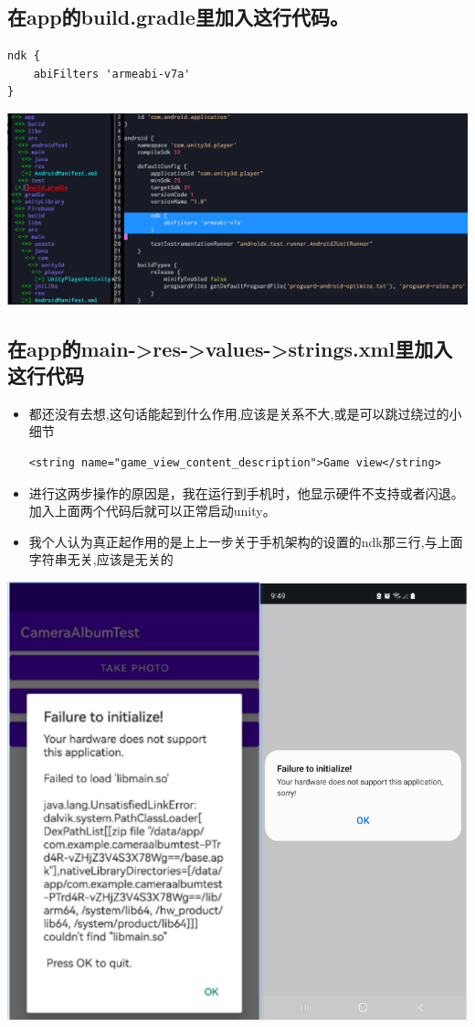 \documentclass[9pt, b5paper]{article}
\begin{document}
\subsection{在app的build.gradle里加入这行代码。}
\label{sec-4-3}
\begin{verbatim}
ndk {
    abiFilters 'armeabi-v7a'
}
\end{verbatim}

\includegraphics[width=.9\linewidth]{./pic/unityToAndroid_20221123_223842.png}
\subsection{在app的main->res->values->strings.xml里加入这行代码}
\label{sec-4-4}
\begin{itemize}
\item 都还没有去想,这句话能起到什么作用,应该是关系不大,或是可以跳过绕过的小细节
\begin{verbatim}
<string name="game_view_content_description">Game view</string>
\end{verbatim}
\item 进行这两步操作的原因是，我在运行到手机时，他显示硬件不支持或者闪退。加入上面两个代码后就可以正常启动unity。
\item 我个人认为真正起作用的是上上一步关于手机架构的设置的ndk那三行,与上面字符串无关,应该是无关的
\end{itemize}

\includegraphics[width=.9\linewidth]{./pic/unityToAndroid_20221123_225409.png}
\end{document}
